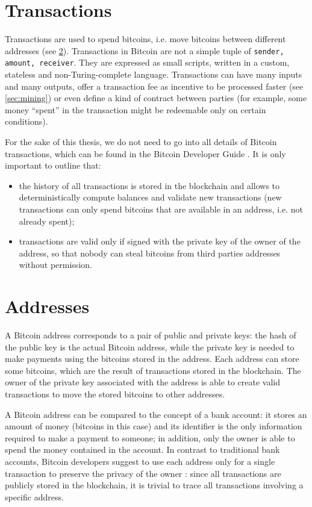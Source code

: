 \section{Transactions}
Transactions are used to spend bitcoins, i.e. move bitcoins between different addresses (see \cref{sec:addresses}).
Transactions in Bitcoin are not a simple tuple of \texttt{\textlangle sender, amount, receiver\textrangle}.
They are expressed as small scripts, written in a custom, stateless and non-Turing-complete language.
Transactions can have many inputs and many outputs, offer a transaction fee as incentive to be processed faster (see \cref{sec:mining}) or even define a kind of contract between parties (for example, some money ``spent'' in the transaction might be redeemable only on certain conditions).

For the sake of this thesis, we do not need to go into all details of Bitcoin transactions, which can be found in the Bitcoin Developer Guide \cite{bitcoin_guide}.
It is only important to outline that:
\begin{itemize}
	\item the history of all transactions is stored in the blockchain and allows to deterministically compute balances and validate new transactions (new transactions can only spend bitcoins that are available in an address, i.e. not already spent);
	\item transactions are valid only if signed with the private key of the owner of the address, so that nobody can steal bitcoins from third parties addresses without permission.
\end{itemize}

\section{Addresses}
\label{sec:addresses}
A Bitcoin address corresponds to a pair of public and private keys: the hash of the public key is the actual Bitcoin address, while the private key is needed to make payments using the bitcoins stored in the address.
Each address can store some bitcoins, which are the result of transactions stored in the blockchain.
The owner of the private key associated with the address is able to create valid transactions to move the stored bitcoins to other addresses.

A Bitcoin address can be compared to the concept of a bank account:
it stores an amount of money (bitcoins in this case) and its identifier is the only information required to make a payment to someone;
in addition, only the owner is able to spend the money contained in the account.
In contrast to traditional bank accounts, Bitcoin developers suggest to use each address only for a single transaction to preserve the privacy of the owner \cite{bitcoin_guide}:
since all transactions are publicly stored in the blockchain, it is trivial to trace all transactions involving a specific address.

